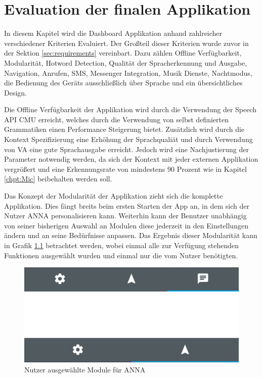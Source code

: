\chapter{Evaluation der finalen Applikation}

In diesem Kapitel wird die Dashboard Applikation anhand zahlreicher verschiedener Kriterien Evaluiert. Der Großteil dieser Kriterien wurde zuvor in der Sektion \ref{sec:requirements} vereinbart. Dazu zählen Offline Verfügbarkeit, Modularität, Hotword Detection, Qualität der Spracherkennung und Ausgabe, Navigation, Anrufen, SMS, Messenger Integration, Musik Dienste, Nachtmodus, die Bedienung des Geräts ausschließlich über Sprache und ein übersichtliches Design.

Die Offline Verfügbarkeit der Applikation wird durch die Verwendung der Speech \ac{API} \ac{CMU} erreicht, welches durch die Verwendung von selbst definierten Grammatiken einen Performance Steigerung bietet. Zusätzlich wird durch die Kontext Spezifizierung eine Erhöhung der Sprachqualiät und durch Verwendung von \ac{VA} eine gute Sprachausgabe erreicht. Jedoch wird eine Nachjustierung der Parameter notwendig werden, da sich der Kontext mit jeder externen Applikation vergrößert und eine Erkennungsrate von mindestens 90 Prozent wie in Kapitel \ref{chpt:Mic} beibehalten werden soll.  

Das Konzept der Modularität der Applikation zieht sich die komplette Applikation. Dies fängt breits beim ersten Starten der App an, in dem sich der Nutzer \ac{ANNA} personalisieren kann. Weiterhin kann der Benutzer unabhängig von seiner bisherigen Auswahl an Modulen diese jederzeit in den Einstellungen ändern und an seine Bedürfnisse anpassen. Das Ergebnis dieser Modularität kann in Grafik \ref{figANNAStatusbar} betrachtet werden, wobei einmal alle zur Verfügung stehenden Funktionen ausgewählt wurden und einmal nur die vom Nutzer benötigten. 

\begin{figure}[h]
	\centering
  \includegraphics[scale=0.5]{images/status_bars.png}
	\caption{Nutzer ausgewählte Module für \ac{ANNA}}
	\label{figANNAStatusbar}
\end{figure}

